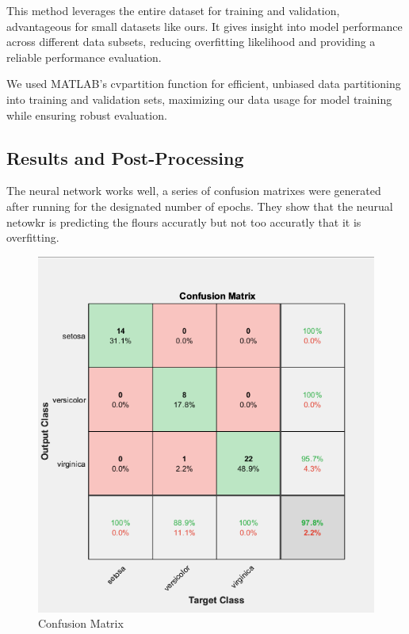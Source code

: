 \documentclass[conference]{inc/IEEEtran}
\begin{document}
This method leverages the entire dataset for training and validation, advantageous for small datasets like ours. It gives insight into model performance across different data subsets, reducing overfitting likelihood and providing a reliable performance evaluation.

We used MATLAB's cvpartition function for efficient, unbiased data partitioning into training and validation sets, maximizing our data usage for model training while ensuring robust evaluation.

\subsection{Results and Post-Processing}

The neural network works well, a series of confusion matrixes were generated after running for the designated number of epochs. They show that the neurual netowkr is predicting the flours accuratly but not too accuratly that it is overfitting. 

\begin{figure}
    \includegraphics[width=\linewidth]{figures/Cm.png}
    \caption{Confusion Matrix}
    \label{fig:boat1}
  \end{figure}
\end{document}
